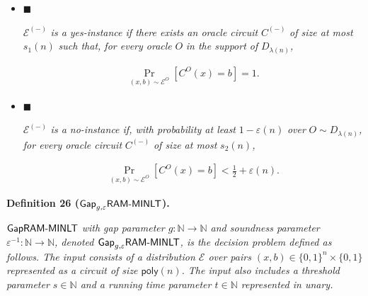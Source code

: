 \documentclass[10pt,a4paper]{article}
\begin{document}
\begin{itemize}


\item[] 
$\blacksquare$ 


$\mathcal{E}^{(-)}$\emph{ is a yes-instance if there exists an oracle circuit }$C^{(-)}$\emph{ of size at most }$s_{1}(n)$\emph{ such that, for every oracle }$O$\emph{ in the support of }$D_{\lambda(n)}$\emph{,}\par


\[\begin{gathered}
\Pr_{(x,b)\sim\mathcal{E}^{O}}\left[C^{O}(x)=b\right]=1.
\end{gathered}\]





\item[] 
$\blacksquare$ 


$\mathcal{E}^{(-)}$\emph{ is a no-instance if, with probability at least }$1-\varepsilon(n)$\emph{ over }$O\sim D_{\lambda(n)}$\emph{, for every oracle circuit }$C^{(-)}$\emph{ of size at most }$s_{2}(n)$\emph{,}\par


\[\begin{gathered}
\Pr_{(x,b)\sim\mathcal{E}^{O}}\left[C^{O}(x)=b\right]<\frac{1}{2}+\varepsilon(n).
\end{gathered}\]





\end{itemize}







\par\medskip\noindent\textbf{
\textbf{Definition 26}\textbf{ }(${\sf Gap}_{g,\varepsilon}{\sf RAM}\text{-}{\sf MINLT}$)\textbf{.}
}\par



${\sf Gap}{\sf RAM}\text{-}{\sf MINLT}$\emph{ with gap parameter $g:\mathbb{N}\to\mathbb{N}$ and soundness parameter $\varepsilon^{-1}:\mathbb{N}\to\mathbb{N}$, denoted ${\sf Gap}_{g,\varepsilon}{\sf RAM}\text{-}{\sf MINLT}$, is the decision problem defined as follows. The input consists of a distribution $\mathcal{E}$ over pairs $(x,b)\in\{0,1\}^{n}\times\{0,1\}$ represented as a circuit of size ${\mathsf{poly}}(n)$. The input also includes a threshold parameter $s\in\mathbb{N}$ and a running time parameter $t\in\mathbb{N}$ represented in unary.}\par
\end{document}
